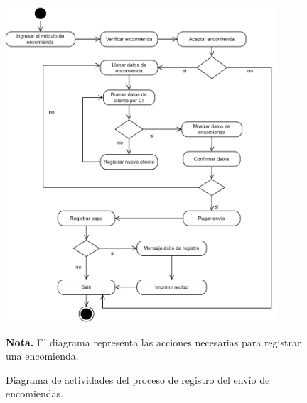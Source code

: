	\begin{figure}[!h] %
		\caption[Diagrama de actividades - Registro de encomiendas]
		{\newline Diagrama de actividades del proceso de registro del envío de encomiendas.} %
		\centering
		\includegraphics[width=0.9\textwidth]{imagenes/cap_3/encomiendas.drawio.png} %
		
		\begin{flushleft}
		\begin{doublespace}
			\hspace{1.20cm} \textbf{Nota.} El diagrama representa las acciones necesarias para registrar una encomienda. %
		\end{doublespace}
		\end{flushleft}
		\vspace{-16pt}
		\label{fig:DA_encomiendas} %
	\end{figure}
	
	\vspace{0.3cm} %
	
